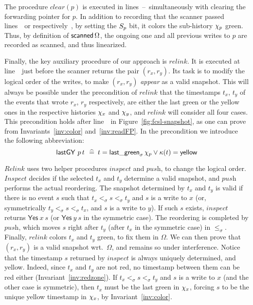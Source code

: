 \documentclass[a4paper,UKenglish]{lipics-v2016}
\newcommand{\aux}[1]{\textit{#1}}
\newcommand{\eqdef}{\mathrel{\:\widehat{=}\:}}
\def\ordlist{\sigma}
\newcommand{\C}{\kappa}
\newcommand{\tleq}{\mathrel{\leq_\ordlist}}
\newcommand{\tle}{\mathrel{<_\ordlist}}
\newcommand{\stableorder}{\Omega}
\def\lgVy{\ensuremath{\mathsf{lastGY}}}
\theoremstyle{definition}
\begin{document}
The procedure $\aux{clear}(p)$ is executed in
lines~\lineScanClearsX--\lineScanClearsY~simultaneously with clearing
the forwarding pointer for $p$. In addition to recording that the
scanner passed lines~\lineScanClearsX\ or
respectively~\lineScanClearsY, by setting the $S_p$ bit, it colors
the sub-history $\chi_p$ green. Thus, by definition of
$\scanned{\stableorder}$, the ongoing one and all previous writes to
$p$ are recorded as scanned, and thus linearized.

Finally, the key auxiliary procedure of our approach is
$\aux{relink}$. It is executed at line~\lineScanRelinks~just before
the scanner returns the pair $(r_x, r_y)$. Its task is to modify the
logical order of the writes, to make $(r_x, r_y)$ \emph{appear} as a
valid snapshot. This will always be possible under the precondition of
$\aux{relink}$ that the timestamps $t_x$, $t_y$ of the events that
wrote $r_x$, $r_y$ respectively, are either the last green or the
yellow ones in the respective histories $\chi_x$ and $\chi_y$, and
$\aux{relink}$ will consider all four cases.  This precondition holds
after line~\lineScanChoosesRY~in Figure~\ref{fig:fcsl-snapshot}, as
one can prove from Invariants~\ref{inv:color} and~\ref{inv:readFP}. In
the precondition we introduce the following abbreviation:
%
\begin{equation}\label{eq:lgVy}
\hfill \lgVy\ p\, t\, \eqdef t = \mathsf{last\_green}_{\ordlist}\,
       \histp \vee \C(t) = \mathsf{yellow}\hfill
\end{equation}

$\aux{Relink}$ uses two helper procedures $\aux{inspect}$ and
$\aux{push}$, to change the logical order. $\aux{Inspect}$ decides if
the selected $t_x$ and $t_y$ determine a valid snapshot, and
$\aux{push}$ performs the actual reordering. The snapshot determined
by $t_x$ and $t_y$ is valid if there is no event $s$ such that
$t_x \tle s \tle t_y$ and $s$ is a write to $x$ (or, symmetrically
$t_y \tle s \tle t_x$, and $s$ is a write to $y$). If such $s$ exists,
$\aux{inspect}$ returns $\mathsf{Yes}\ x\ s$ (or $\mathsf{Yes}\ y\ s$
in the symmetric case). The reordering is completed by $\aux{push}$,
which moves $s$ right after $t_y$ (after $t_x$ in the symmetric case)
in $\tleq$. Finally, $\aux{relink}$ colors $t_x$ and $t_y$ green, to
fix them in $\stableorder$. We can then prove that $(r_x, r_y)$ is a
valid snapshot wrt.~$\stableorder$, and remains so under interference.
%
Notice that the timestamp $s$ returned by $\aux{inspect}$ is always
uniquely determined, and yellow. Indeed, since $t_x$ and $t_y$ are not
red, no timestamp between them can be red either
(Invariant~\ref{inv:redzone}). If $t_x \tle s \tle t_y$ and $s$ is a
write to $x$ (and the other case is symmetric), then $t_x$ must be the
last green in $\chi_x$, forcing $s$ to be the unique yellow timestamp
in $\chi_x$, by Invariant~\ref{inv:color}.
\end{document}
